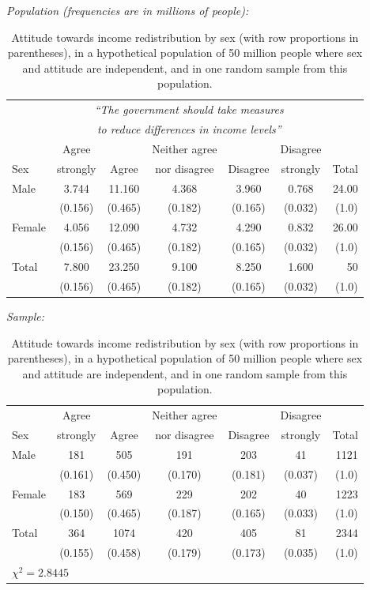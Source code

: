 \begin{table}[t]
\caption{Attitude towards income redistribution by sex (with row
proportions in parentheses), in a hypothetical
population of 50 million people where sex and attitude are independent,
and in one random sample from this population.}
\label{t_sex_attitude_H0pop}


\emph{Population (frequencies are in millions of people):}
\begin{center}
\begin{tabular}{|l|ccccc|r|}\hline
& \multicolumn{5}{|c|}{\emph{``The government should
take measures}} & \\
& \multicolumn{5}{|c|}{\emph{to reduce differences in income levels''}}
& \\
 & Agree & & Neither agree & & Disagree & \\
Sex & strongly & Agree & nor disagree & Disagree & strongly & Total \\ \hline
Male & 3.744& 11.160& 4.368& 3.960& 0.768&  24.00\\
 & (0.156) & (0.465) & (0.182) & (0.165)& (0.032) & (1.0)  \\
Female & 4.056& 12.090& 4.732& 4.290& 0.832& 26.00\\
 & (0.156) & (0.465) & (0.182) & (0.165)& (0.032) & (1.0) \\
\hline
Total & 7.800 & 23.250 &  9.100&  8.250& 1.600 & 50 \\
 & (0.156) & (0.465) & (0.182) & (0.165)& (0.032) & (1.0) \\
\hline
\end{tabular}
\end{center}

\emph{Sample:}
\begin{center}
\begin{tabular}{|l|ccccc|r|}\hline
 & Agree & & Neither agree & & Disagree & \\
Sex & strongly & Agree & nor disagree & Disagree & strongly & Total \\ \hline
Male & 181& 505& 191& 203& 41& 1121 \\
 & (0.161) & (0.450) & (0.170) & (0.181)& (0.037) & (1.0)  \\
Female & 183& 569& 229& 202& 40& 1223\\
 & (0.150) & (0.465) & (0.187) & (0.165)& (0.033) & (1.0) \\
\hline
Total & 364& 1074& 420& 405& 81& 2344 \\
 & (0.155) & (0.458) & (0.179) & (0.173)& (0.035) & (1.0) \\
\hline
\multicolumn{7}{l}{\small $\chi^{2}=2.8445$}
\end{tabular}
\end{center}

\end{table}


